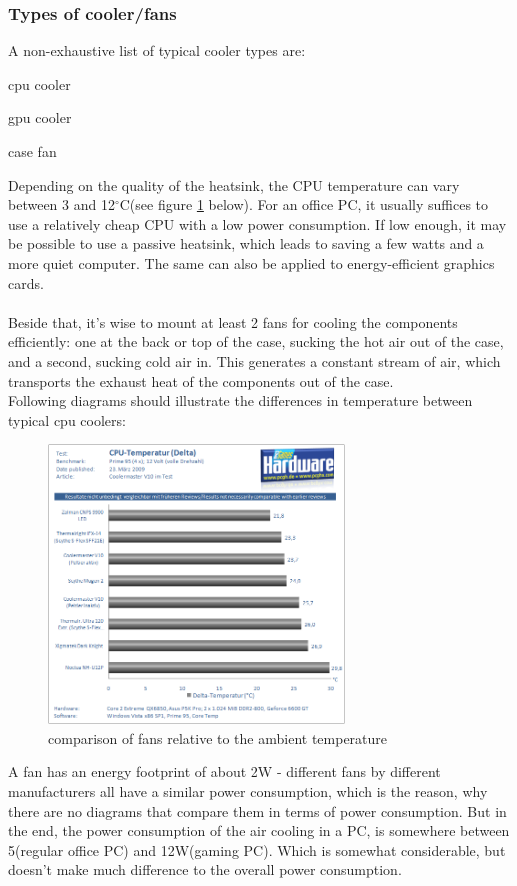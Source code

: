 \subsubsection{Types of cooler/fans}
A non-exhaustive list of typical cooler types are:
\begin{compactitem}
  \item cpu cooler
  \item gpu cooler
  \item case fan
\end{compactitem}
Depending on the quality of the heatsink, the CPU temperature can vary between 3 and 12$^\circ$C(see figure \ref{fig:comparison_fans} below). For an office PC, it usually suffices to use a relatively cheap CPU
with a low power consumption. If low enough, it may be possible to use a passive heatsink, which leads to saving a few watts and a more quiet computer.
The same can also be applied to energy-efficient graphics cards.
\\\\
Beside that, it's wise to mount at least 2 fans for cooling the components efficiently: one at the back or top of the case, sucking the hot air out of the case, and a second, 
sucking cold air in. This generates a constant stream of air, which transports the exhaust heat of the components out of the case.\\
Following diagrams should illustrate the differences in temperature between typical cpu coolers:\\
\begin{figure}[H]
  \centering
  \includegraphics[width=0.7\textwidth]{./graphics/Temperatur}
  \caption{comparison of fans relative to the ambient temperature}
  \label{fig:comparison_fans}
\end{figure}
A fan has an energy footprint of about 2W - different fans by different manufacturers all have a similar power consumption, which is the reason, why there are no diagrams that compare them
in terms of power consumption. But in the end, the power consumption of the air cooling in a PC, is somewhere between 5(regular office PC) and 12W(gaming PC). Which is somewhat considerable, 
but doesn't make much difference to the overall power consumption. 

